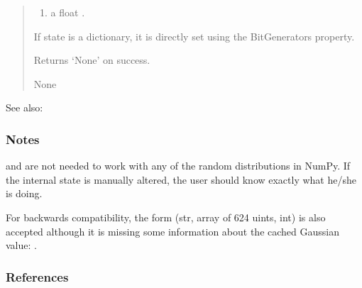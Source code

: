 \documentclass[letterpaper,10pt,english]{sphinxmanual}
\begin{document}
\begin{fulllineitems}
\begin{quote}
\begin{description}
\begin{enumerate}
\item {} 
\sphinxAtStartPar
a float .

\end{enumerate}

\sphinxAtStartPar
If state is a dictionary, it is directly set using the BitGenerators
 property.


\sphinxAtStartPar
{} \textendash{} Returns ‘None’ on success.

\sphinxAtStartPar
None

\end{description}\end{quote}


\begin{sphinxseealso}{See also:}

\sphinxAtStartPar
{\hyperref[\detokenize{metilda.controllers:metilda.controllers.pitch_art_wizard.get_state}]{}}


\end{sphinxseealso}

\subsubsection*{Notes}

\sphinxAtStartPar
{} and  are not needed to work with any of the
random distributions in NumPy. If the internal state is manually altered,
the user should know exactly what he/she is doing.

\sphinxAtStartPar
For backwards compatibility, the form (str, array of 624 uints, int) is
also accepted although it is missing some information about the cached
Gaussian value: .
\subsubsection*{References}

\end{fulllineitems}


\begin{fulllineitems}
\label{\detokenize{metilda.controllers:metilda.controllers.pitch_art_wizard.share_file}}
\pysigstartsignatures
{}
\pysigstopsignatures
\end{fulllineitems}
\end{document}
